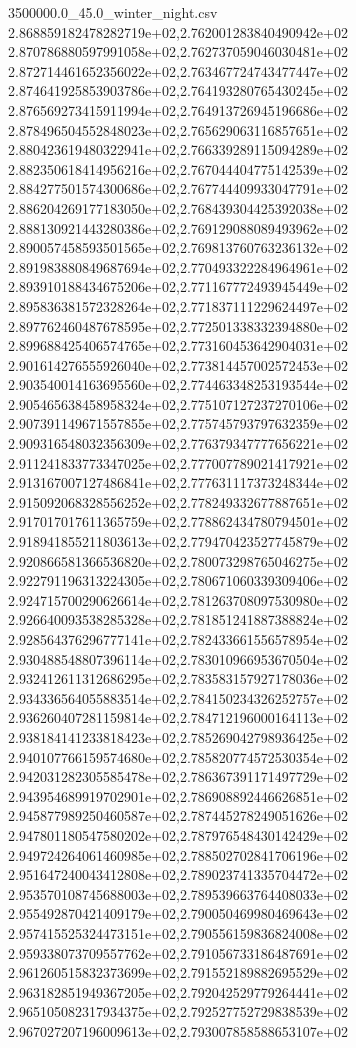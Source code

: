 \begin{filecontents*}{3500000.0_45.0_winter_night.csv}
2.868859182478282719e+02,2.762001283840490942e+02
2.870786880597991058e+02,2.762737059046030481e+02
2.872714461652356022e+02,2.763467724743477447e+02
2.874641925853903786e+02,2.764193280765430245e+02
2.876569273415911994e+02,2.764913726945196686e+02
2.878496504552848023e+02,2.765629063116857651e+02
2.880423619480322941e+02,2.766339289115094289e+02
2.882350618414956216e+02,2.767044404775142539e+02
2.884277501574300686e+02,2.767744409933047791e+02
2.886204269177183050e+02,2.768439304425392038e+02
2.888130921443280386e+02,2.769129088089493962e+02
2.890057458593501565e+02,2.769813760763236132e+02
2.891983880849687694e+02,2.770493322284964961e+02
2.893910188434675206e+02,2.771167772493945449e+02
2.895836381572328264e+02,2.771837111229624497e+02
2.897762460487678595e+02,2.772501338332394880e+02
2.899688425406574765e+02,2.773160453642904031e+02
2.901614276555926040e+02,2.773814457002572453e+02
2.903540014163695560e+02,2.774463348253193544e+02
2.905465638458958324e+02,2.775107127237270106e+02
2.907391149671557855e+02,2.775745793797632359e+02
2.909316548032356309e+02,2.776379347777656221e+02
2.911241833773347025e+02,2.777007789021417921e+02
2.913167007127486841e+02,2.777631117373248344e+02
2.915092068328556252e+02,2.778249332677887651e+02
2.917017017611365759e+02,2.778862434780794501e+02
2.918941855211803613e+02,2.779470423527745879e+02
2.920866581366536820e+02,2.780073298765046275e+02
2.922791196313224305e+02,2.780671060339309406e+02
2.924715700290626614e+02,2.781263708097530980e+02
2.926640093538285328e+02,2.781851241887388824e+02
2.928564376296777141e+02,2.782433661556578954e+02
2.930488548807396114e+02,2.783010966953670504e+02
2.932412611312686295e+02,2.783583157927178036e+02
2.934336564055883514e+02,2.784150234326252757e+02
2.936260407281159814e+02,2.784712196000164113e+02
2.938184141233818423e+02,2.785269042798936425e+02
2.940107766159574680e+02,2.785820774572530354e+02
2.942031282305585478e+02,2.786367391171497729e+02
2.943954689919702901e+02,2.786908892446626851e+02
2.945877989250460587e+02,2.787445278249051626e+02
2.947801180547580202e+02,2.787976548430142429e+02
2.949724264061460985e+02,2.788502702841706196e+02
2.951647240043412808e+02,2.789023741335704472e+02
2.953570108745688003e+02,2.789539663764408033e+02
2.955492870421409179e+02,2.790050469980469643e+02
2.957415525324473151e+02,2.790556159836824008e+02
2.959338073709557762e+02,2.791056733186487691e+02
2.961260515832373699e+02,2.791552189882695529e+02
2.963182851949367205e+02,2.792042529779264441e+02
2.965105082317934375e+02,2.792527752729838539e+02
2.967027207196009613e+02,2.793007858588653107e+02

\end{filecontents*}
